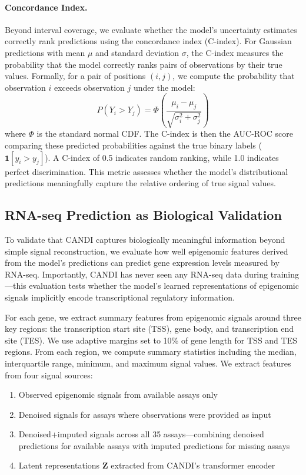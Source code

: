 \paragraph{Concordance Index.}
Beyond interval coverage, we evaluate whether the model's uncertainty estimates correctly rank predictions using the concordance index (C-index). For Gaussian predictions with mean $\mu$ and standard deviation $\sigma$, the C-index measures the probability that the model correctly ranks pairs of observations by their true values. Formally, for a pair of positions $(i, j)$, we compute the probability that observation $i$ exceeds observation $j$ under the model:
\begin{equation}
    P(Y_i > Y_j) = \Phi\left(\frac{\mu_i - \mu_j}{\sqrt{\sigma_i^2 + \sigma_j^2}}\right)
\end{equation}
where $\Phi$ is the standard normal CDF. The C-index is then the AUC-ROC score comparing these predicted probabilities against the true binary labels ($\mathbf{1}[y_i > y_j]$). A C-index of 0.5 indicates random ranking, while 1.0 indicates perfect discrimination. This metric assesses whether the model's distributional predictions meaningfully capture the relative ordering of true signal values.


\subsection{RNA-seq Prediction as Biological Validation}

To validate that CANDI captures biologically meaningful information beyond simple signal reconstruction, we evaluate how well epigenomic features derived from the model's predictions can predict gene expression levels measured by RNA-seq. Importantly, CANDI has never seen any RNA-seq data during training---this evaluation tests whether the model's learned representations of epigenomic signals implicitly encode transcriptional regulatory information.

For each gene, we extract summary features from epigenomic signals around three key regions: the transcription start site (TSS), gene body, and transcription end site (TES). We use adaptive margins set to 10\% of gene length for TSS and TES regions. From each region, we compute summary statistics including the median, interquartile range, minimum, and maximum signal values. We extract features from four signal sources:
\begin{enumerate}
    \item Observed epigenomic signals from available assays only
    \item Denoised signals for assays where observations were provided as input
    \item Denoised+imputed signals across all 35 assays---combining denoised predictions for available assays with imputed predictions for missing assays
    \item Latent representations $\mathbf{Z}$ extracted from CANDI's transformer encoder
\end{enumerate}

